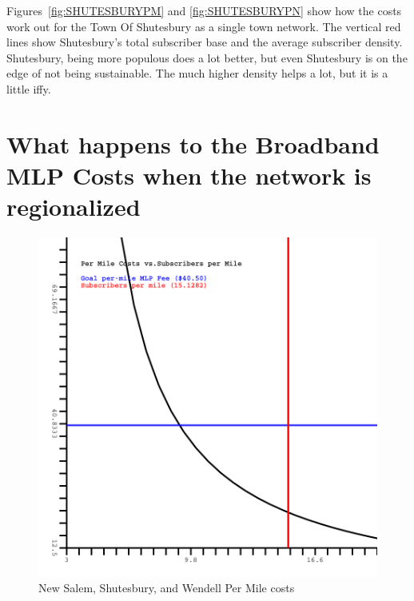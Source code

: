 \documentclass[12pt]{article}
\begin{document}
\clearpage

Figures~\ref{fig:SHUTESBURYPM} and \ref{fig:SHUTESBURYPN} show how the costs
work out for the Town Of Shutesbury as a single town network. The vertical red
lines show Shutesbury's total subscriber base and the average subscriber
density.  Shutesbury, being more populous does a lot better, but even 
Shutesbury is on the edge of not being sustainable.  The much higher density 
helps a lot, but it is a little iffy.  


\section{What happens to the Broadband MLP Costs when the network is 
regionalized}

\begin{figure}[Hptb]
\begin{centering}
\includegraphics[width=5in]{NEW_SALEM-SHUTESBURY-WENDELL-PerMile.pdf}
\caption{New Salem, Shutesbury, and Wendell Per Mile costs}
\label{fig:NEWSALEM-SHUTESBURY-WENDELLPM}
\end{centering}
\end{figure}
\end{document}
